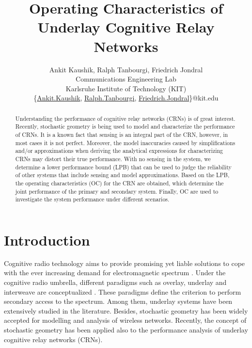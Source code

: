 \documentclass[conference, twocolumn]{IEEEtran}
\begin{document}
%
\title{Operating Characteristics of Underlay Cognitive Relay Networks}
\author{Ankit Kaushik, Ralph Tanbourgi, Friedrich Jondral \\ Communications Engineering Lab \\ Karlsruhe Institute of Technology (KIT) \\ \{\href{mailto:Ankit.Kaushik@kit.edu}{Ankit.Kaushik}, 
\href{mailto:Ralph.Tanbourgi@kit.edu}{Ralph.Tanbourgi}, \href{mailto:Friedrich.Jondral@kit.edu}{Friedrich.Jondral}\}@kit.edu
}

\maketitle
\thispagestyle{empty}
\pagestyle{empty}

\begin{abstract}
Understanding the performance of cognitive relay networks (CRNs) is of great interest. Recently, stochastic geometry is being used to model and characterize the performance of CRNs. It is a known fact that sensing is an integral part of the CRN, however, in most cases it is not perfect. Moreover, the model inaccuracies caused by simplifications and/or approximations when deriving the analytical expressions for characterizing CRNs may distort their true performance. 
With no sensing in the system, we determine a lower performance bound (LPB) that can be used to judge the reliability of other systems that include sensing and model approximations. Based on the LPB, the operating characteristics (OC) for the CRN are obtained, which determine the joint performance of the primary and secondary system. Finally, OC are used to investigate the system performance under different scenarios.  
\end{abstract}
\section{Introduction}%
Cognitive radio technology aims to provide promising yet liable solutions to cope with the ever increasing demand for electromagnetic spectrum \cite{Haykin}. Under the cognitive radio umbrella, different paradigms such as overlay, underlay and interweave are conceptualized \cite{Goldsmith09}. These paradigms define the criterion to perform secondary access to the spectrum. Among them, underlay systems have been extensively studied in the literature. 
Besides, stochastic geometry \cite{Elsawy13} has been widely accepted for modelling and analysis of wireless networks. Recently, the concept of stochastic geometry has been applied also to the performance analysis of underlay cognitive relay networks (CRNs). 
\end{document}
